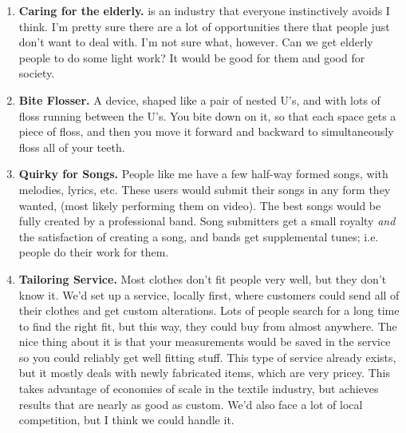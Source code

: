 \documentclass[paper=a4, fontsize=11pt]{scrartcl} %
\numberwithin{equation}{section} %
\numberwithin{figure}{section} %
\numberwithin{table}{section} %
\begin{document}
\begin{enumerate}
\item \textbf{Caring for the elderly.} is an industry that everyone instinctively avoids I think.  I'm pretty sure there are a lot of opportunities there that people just don't want to deal with.  I'm not sure what, however.  Can we get elderly people to do some light work?  It would be good for them and good for society.

\item \textbf{Bite Flosser.}  A device, shaped like a pair of nested U's, and with lots of floss running between the U's.  You bite down on it, so that each space gets a piece of floss, and then you move it forward and backward to simultaneously floss all of your teeth.

\item \textbf{Quirky for Songs.}  People like me have a few half-way formed songs, with melodies, lyrics, etc.  These users would submit their songs in any form they wanted, (most likely performing them on video).  The best songs would be fully created by a professional band.  Song submitters get a small royalty \textit{and} the satisfaction of creating a song, and bands get supplemental tunes; i.e. people do their work for them.

\item \textbf{Tailoring Service.}  Most clothes don't fit people very well, but they don't know it.  We'd set up a service, locally first, where customers could send all of their clothes and get custom alterations.  Lots of people search for a long time to find the right fit, but this way, they could buy from almost anywhere.  The nice thing about it is that your measurements would be saved in the service so you could reliably get well fitting stuff.  This type of service already exists, but it mostly deals with newly fabricated items, which are very pricey.  This takes advantage of economies of scale in the textile industry, but achieves results that are nearly as good as custom.  We'd also face a lot of local competition, but I think we could handle it.


\end{enumerate}
\end{document}
